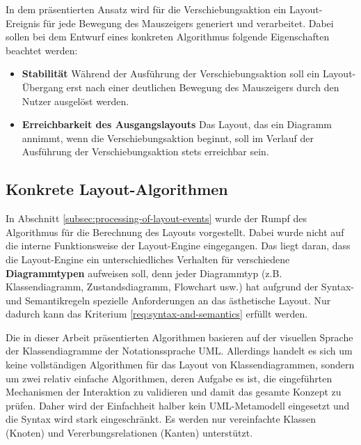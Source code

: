 In dem präsentierten Ansatz wird für die Verschiebungsaktion ein Layout-Ereignis für jede Bewegung des Mauszeigers generiert und verarbeitet. Dabei sollen bei dem Entwurf eines konkreten Algorithmus folgende Eigenschaften beachtet werden:

\newpage

\begin{itemize}

\item
\textbf{Stabilität}
Während der Ausführung der Verschiebungsaktion soll ein Layout-Übergang erst nach einer deutlichen Bewegung des Mauszeigers durch den Nutzer ausgelöst werden.

\item
\textbf{Erreichbarkeit des Ausgangslayouts}
Das Layout, das ein Diagramm annimmt, wenn die Verschiebungsaktion beginnt, soll im Verlauf der Ausführung der Verschiebungsaktion stets erreichbar sein.

\end{itemize}

\subsection{Konkrete Layout-Algorithmen}
\label{subsec:concrete-layout-algorithms}

In Abschnitt \ref{subsec:processing-of-layout-events} wurde der Rumpf des Algorithmus für die Berechnung des Layouts vorgestellt. Dabei wurde nicht auf die interne Funktionsweise der Layout-Engine eingegangen. Das liegt daran, dass die Layout-Engine ein unterschiedliches Verhalten für verschiedene \textbf{Diagrammtypen} aufweisen soll, denn jeder Diagrammtyp (z.B. Klassendiagramm, Zustandsdiagramm, Flowchart usw.) hat aufgrund der Syntax- und Semantikregeln spezielle Anforderungen an das ästhetische Layout. Nur dadurch kann das Kriterium \ref{req:syntax-and-semantics} erfüllt werden.

Die in dieser Arbeit präsentierten Algorithmen basieren auf der visuellen Sprache der Klassendiagramme der Notationssprache UML. Allerdings handelt es sich um keine vollständigen Algorithmen für das Layout von Klassendiagrammen, sondern um zwei relativ einfache Algorithmen, deren Aufgabe es ist, die eingeführten Mechanismen der Interaktion zu validieren und damit das gesamte Konzept zu prüfen. Daher wird der Einfachheit halber kein UML-Metamodell eingesetzt und die Syntax wird stark eingeschränkt. Es werden nur vereinfachte Klassen (Knoten) und Vererbungsrelationen (Kanten) unterstützt.

